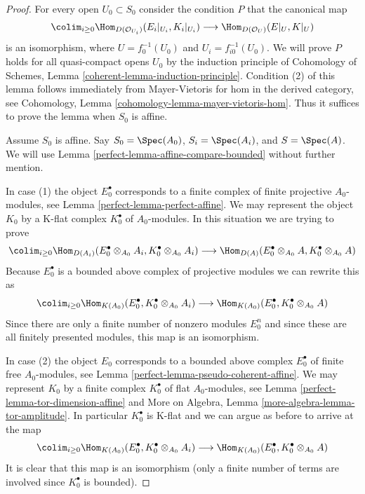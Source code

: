 \begin{proof}

For every open $U_0 \subset S_0$ consider the condition $P$ that the canonical
map
$$
\colim_{i \geq 0} \Hom_{D(\mathcal{O}_{U_i})}(E_i|_{U_i}, K_i|_{U_i})
\longrightarrow
\Hom_{D(\mathcal{O}_U)}(E|_U, K|_U)
$$
is an isomorphism, where $U = f_0^{-1}(U_0)$ and $U_i = f_{i0}^{-1}(U_0)$.
We will prove $P$ holds for all quasi-compact opens $U_0$
by the induction principle of
Cohomology of Schemes, Lemma \ref{coherent-lemma-induction-principle}.
Condition (2) of this lemma follows immediately from Mayer-Vietoris
for hom in the derived category, see
Cohomology, Lemma \ref{cohomology-lemma-mayer-vietoris-hom}.
Thus it suffices to prove the lemma when $S_0$ is affine.

\medskip\noindent
Assume $S_0$ is affine. Say $S_0 = \Spec(A_0)$, $S_i = \Spec(A_i)$, and
$S = \Spec(A)$. We will use Lemma \ref{perfect-lemma-affine-compare-bounded}
without further mention.

\medskip\noindent
In case (1) the object $E_0^\bullet$ corresponds to a finite complex
of finite projective $A_0$-modules, see Lemma \ref{perfect-lemma-perfect-affine}.
We may represent the object $K_0$ by a K-flat complex $K_0^\bullet$
of $A_0$-modules. In this situation we are trying to prove
$$
\colim_{i \geq 0} \Hom_{D(A_i)}(E_0^\bullet \otimes_{A_0} A_i,
K_0^\bullet \otimes_{A_0} A_i)
\longrightarrow
\Hom_{D(A)}(E_0^\bullet \otimes_{A_0} A, K_0^\bullet \otimes_{A_0} A)
$$
Because $E_0^\bullet$ is a bounded above complex of projective modules
we can rewrite this as
$$
\colim_{i \geq 0} \Hom_{K(A_0)}(E_0^\bullet,
K_0^\bullet \otimes_{A_0} A_i)
\longrightarrow
\Hom_{K(A_0)}(E_0^\bullet, K_0^\bullet \otimes_{A_0} A)
$$
Since there are only a finite number of nonzero modules
$E_0^n$ and since these are all finitely presented modules, this
map is an isomorphism.

\medskip\noindent
In case (2) the object $E_0$ corresponds to a
bounded above complex $E_0^\bullet$ of finite free $A_0$-modules,
see Lemma \ref{perfect-lemma-pseudo-coherent-affine}.
We may represent $K_0$ by a finite complex $K_0^\bullet$
of flat $A_0$-modules, see Lemma \ref{perfect-lemma-tor-dimension-affine}
and
More on Algebra, Lemma \ref{more-algebra-lemma-tor-amplitude}.
In particular $K_0^\bullet$ is K-flat and we can argue as before
to arrive at the map
$$
\colim_{i \geq 0} \Hom_{K(A_0)}(E_0^\bullet,
K_0^\bullet \otimes_{A_0} A_i)
\longrightarrow
\Hom_{K(A_0)}(E_0^\bullet, K_0^\bullet \otimes_{A_0} A)
$$
It is clear that this map is an isomorphism (only a finite number of
terms are involved since $K_0^\bullet$ is bounded).
\end{proof}

